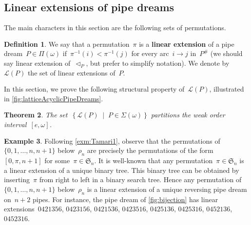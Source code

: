 \documentclass[reqno]{amsart}
\newtheorem{theorem}{Theorem}[section]
\theoremstyle{definition}
\newtheorem{definition}[theorem]{Definition}
\newtheorem{example}[theorem]{Example}
\newcommand{\set}[2]{\left\{ #1 \;\middle|\; #2 \right\}} %
\newcommand{\ie}{\textit{i.e.}~} %
\newcommand{\defn}[1]{\textbf{\textsf{\color{PineGreen} #1}}} %
\newcommand{\fS}{\mathfrak{S}} %
\newcommand{\pipeDreams}{\Pi} %
\newcommand{\contact}{^\#} %
\newcommand{\acyclicPipeDreams}{\Sigma} %
\newcommand{\linearExtensions}{\mathcal{L}} %
\newcommand{\less}{\vartriangleleft} %
\newcommand{\contactLess}[1]{\less_{#1}} %
\begin{document}
\subsection{Linear extensions of pipe dreams}
\label{subsec:linearExtensions}

The main characters in this section are the following sets of permutations.


\begin{definition}
\label{def:linearExtensions}
We say that a permutation~$\pi$ is a \defn{linear extension} of a pipe dream~$P \in \pipeDreams(\omega)$ if~$\pi^{-1}(i) < \pi^{-1}(j)$ for every arc~$i \to j$ in~$P\contact$ (we should say linear extension of~$\contactLess{P}$, but prefer to simplify notation).
We denote by~$\linearExtensions(P)$ the set of linear extensions of~$P$.
\end{definition}

In this section, we prove the following structural property of~$\linearExtensions(P)$, illustrated in \cref{fig:latticeAcyclicPipeDreams}.

\begin{theorem}
\label{thm:partitionPipeDreams}
The set~$\set{\linearExtensions(P)}{P \in \acyclicPipeDreams(\omega)}$ partitions the weak order interval~$[e,\omega]$.
\end{theorem}

\begin{example}
\label{exm:Tamari2}
Following \cref{exm:Tamari1}, observe that the permutations of~$\{0, 1, \dots, n, n+1\}$ below~$\rho_n$ are precisely the permutations of the form~$[0, \pi, n+1]$ for some~$\pi \in \fS_n$.
It is well-known that any permutation~$\pi \in \fS_n$ is a linear extension of a unique binary tree.
This binary tree can be obtained by inserting~$\pi$ from right to left in a binary search tree.
Hence any permutation of~$\{0, 1, \dots, n, n+1\}$ below~$\rho_n$ is a linear extension of a unique reversing pipe dream on~$n+2$ pipes.
For instance, the pipe dream of \cref{fig:bijection} has linear extensions~$0421356$, $0423156$, $0421536$, $0423516$, $0425136$, $0425316$, $0452136$, $0452316$.
\end{example}
\end{document}
